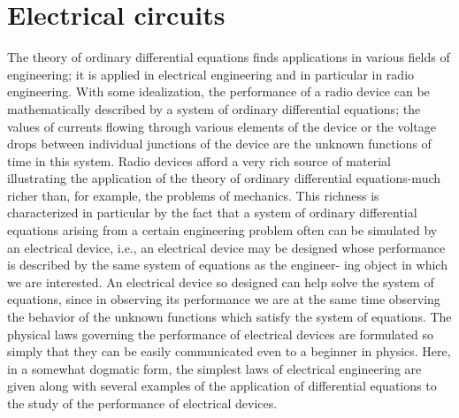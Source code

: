 \documentclass[10pt,a5paper]{book}
\theoremstyle{plain}
\theoremstyle{definition}
\theoremstyle{remark}
\begin{document}
\section{Electrical circuits}
The theory of ordinary differential equations finds applications in various fields of engineering; it is applied in electrical engineering and in particular in radio engineering. With some idealization, the performance of a radio device can be mathematically described by a system of ordinary differential equations; the values of currents flowing through various elements of the device or the voltage drops between individual junctions of the device are the unknown functions of time in this system. Radio devices afford a very rich source of material illustrating the application of the theory of ordinary differential equations-much richer than, for example, the problems of mechanics. This richness is characterized in particular by the fact that a system of ordinary differential equations arising from a certain engineering problem often can be simulated by an electrical device, i.e., an electrical device may be designed whose performance is described by the same system of equations as the engineer-
ing object in which we are interested. An electrical device so designed can help solve the system of equations, since in observing its performance we are at the same time observing the behavior of the unknown functions which satisfy the system of equations. The physical laws governing the performance of electrical devices are formulated so simply that they can be easily communicated even to a beginner in physics. Here, in a somewhat dogmatic form, the simplest laws of electrical engineering are given along with several examples of the application of differential equations to the study of the performance of electrical devices.
\end{document}
